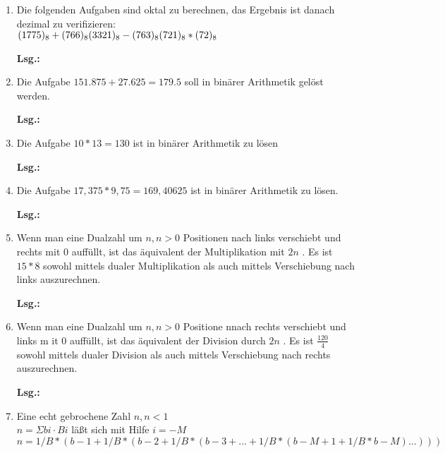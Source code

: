 \documentclass[12pt,a4paper]{scrreprt}
\newcommand{\Lsg}{\par \textbf{Lsg.: \hfill }}
\begin{document}
\begin{enumerate}
\Lsg%

\item Die folgenden Aufgaben sind oktal zu berechnen, das Ergebnis ist danach dezimal zu verifizieren: \\
\begin{math}
(1775)_8 + (766)_8 \\
(3321)_8 - (763)_8 \\
(721)_8 * (72)_8
\end{math}

\Lsg%

\item Die Aufgabe $151.875 + 27.625 = 179.5$ soll in binärer Arithmetik gelöst werden.

\Lsg%

\item Die Aufgabe $10*13=130$ ist in binärer Arithmetik zu lösen

\Lsg%

\item Die Aufgabe $17,375*9,75 = 169,40625$ ist in binärer Arithmetik zu lösen.

\Lsg%

\item Wenn man eine Dualzahl um $n, n>0$ Positionen nach links verschiebt und rechts mit $0$ auffüllt, ist das äquivalent der Multiplikation mit $2 n$ . Es ist $15*8$ sowohl mittels dualer Multiplikation als auch mittels Verschiebung nach links auszurechnen.

\Lsg%

\item Wenn man eine Dualzahl um $n, n>0$ Positione nnach rechts verschiebt und links m it $0$ auffüllt, ist das äquivalent der Division durch $2n$ . Es ist $\frac{120}{4}$ sowohl mittels dualer Division als auch mittels Verschiebung nach rechts auszurechnen.

\Lsg%

\item Eine echt gebrochene Zahl $n, n<1$ \\
\begin{math}
n =
\Sigma
bi \cdot B
i
\end{math}
läßt sich mit Hilfe
$i = -M$
\begin{math}
n = 1/B*(b -1 + 1 / B * ( b -2 + 1/B*(b -3 + ... + 1/B*(b -M +1 + 1 / B * b -M ) \ldots)))
\end{math}


\end{enumerate}
\end{document}
